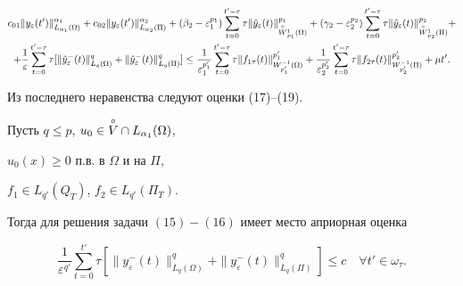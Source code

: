 \begin{pf}
\begin{gather*} 


c_{01}\|y_\varepsilon(t')\|^{\alpha_1}_{L_{\alpha_1}(\Omega)}+ 


c_{02}\|y_\varepsilon(t')\|^{\alpha_2}_{L_{\alpha_2}(\Pi)}+


(\beta_2-\varepsilon^{p_1}_1) 


\sum^{t'-\tau}_{t=0}\tau 


\|\Hat y_\varepsilon(t)\|^{p_1}_{\oc W{}^1_{p_1}(\Omega)}+


(\gamma_2-\varepsilon^{p_2}_2) 


\sum^{t'-\tau}_{t=0}\tau 


\|\Hat y_\varepsilon(t)\|^{p_2}_{\oc W{}^1_{p_2}(\Pi)}+\notag \\


+\frac{1}{\varepsilon}


\sum^{t'-\tau}_{t=0}\tau[\|\Hat y_\varepsilon^-(t)\|^q_{L_q(\Omega)}+ 


\|\Hat y_\varepsilon^-(t)\|^q_{L_q(\Pi)}] \le


\frac{1}{\varepsilon^{p'_1}_1} 


\sum^{t'-\tau}_{t=0}\tau 


\|f_{1\tau}(t)\|^{p'_1}_{W^{-1}_{p'_1}(\Omega)} + 


\frac{1}{\varepsilon^{p'_2}_2} 


\sum^{t'-\tau}_{t=0}\tau 


\|f_{2\tau}(t)\|^{p'_2}_{W^{-1}_{p'_2}(\Pi)}+\mu t'.


\end{gather*} 


Из последнего неравенства следуют оценки (17)--(19).


\end{pf} 


% 


\begin{lem} 


Пусть $q\le p$, $u_0\in \overset{\circ} V\cap L_{\alpha_1}(\Omega)$, 


$u_0(x)\ge 0$ п.в. в $\Omega$ и на $\Pi$, 


$f_1\in L_{q'}(Q_T)$, $f_2\in L_{q'}(\Pi_T)$. 


Тогда для решения задачи $(15)-(16)$ имеет место априорная оценка 


\begin{equation} 


\frac{1}{\varepsilon^{q'}} 


\sum^{t'}_{t=0}\tau[ 


\|y_\varepsilon^-(t)\|^q_{L_q(\Omega)}+ 


\|y_\varepsilon^-(t)\|^q_{L_q(\Pi)}] \le c \quad \forall t'\in\omega_\tau. 


\end{equation} 


\end{lem} 



